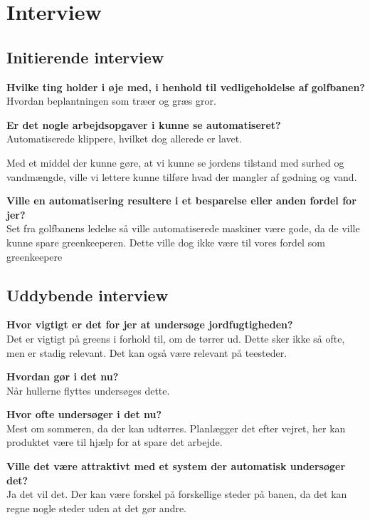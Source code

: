 \chapter{Interview} \label{cha:interviewKim}
\section*{Initierende interview}
\textbf{Hvilke ting holder i øje med, i henhold til vedligeholdelse af golfbanen?}\\
Hvordan beplantningen som træer og græs gror.

\textbf{Er det nogle arbejdsopgaver i kunne se automatiseret?}\\
Automatiserede klippere, hvilket dog allerede er lavet.

Med et middel der kunne gøre, at vi kunne se jordens tilstand med surhed og vandmængde, ville vi lettere kunne tilføre hvad der mangler af gødning og vand.

\textbf{Ville en automatisering resultere i et besparelse eller anden fordel for jer?}\\

Set fra golfbanens ledelse så ville automatiserede maskiner være gode, da de ville kunne spare greenkeeperen.
Dette ville dog ikke være til vores fordel som greenkeepere

\section*{Uddybende interview}

\textbf{Hvor vigtigt er det for jer at undersøge jordfugtigheden?}\\
Det er vigtigt på greens i forhold til, om de tørrer ud. Dette sker ikke så ofte, men er stadig relevant.
Det kan også være relevant på teesteder.

\textbf{Hvordan gør i det nu?}\\
Når hullerne flyttes undersøges dette.

\textbf{Hvor ofte undersøger i det nu?}\\
Mest om sommeren, da der kan udtørres. Planlægger det efter vejret, her kan produktet være til hjælp for at spare det arbejde.

\textbf{Ville det være attraktivt med et system der automatisk undersøger det?}\\
Ja det vil det. Der kan være forskel på forskellige steder på banen, da det kan regne nogle steder uden at det gør andre.


